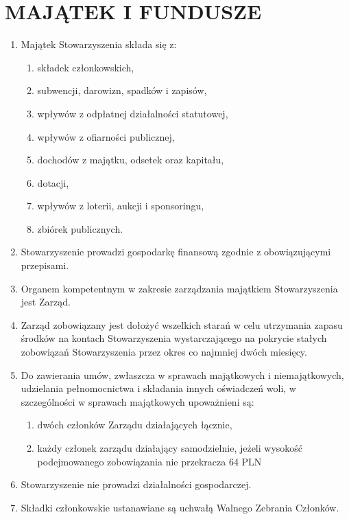 \documentclass{article}
\begin{document}
\section{MAJĄTEK I FUNDUSZE}
  \begin{enumerate}
    \item Majątek Stowarzyszenia składa się z:
      \begin{enumerate}
        \item składek członkowskich,
        \item subwencji, darowizn, spadków i zapisów,
        \item wpływów z odpłatnej działalności statutowej,
        \item wpływów z ofiarności publicznej,
        \item dochodów z majątku, odsetek oraz kapitału,
        \item dotacji,
        \item wpływów z loterii, aukcji i sponsoringu,
        \item zbiórek publicznych.
      \end{enumerate}
    \item Stowarzyszenie prowadzi gospodarkę finansową zgodnie z obowiązującymi przepisami.
    \item Organem kompetentnym w zakresie zarządzania majątkiem Stowarzyszenia jest Zarząd.
    \item Zarząd zobowiązany jest dołożyć wszelkich starań w celu utrzymania zapasu środków na kontach Stowarzyszenia wystarczającego na pokrycie stałych zobowiązań Stowarzyszenia przez okres co najmniej dwóch miesięcy.
    \item Do zawierania umów, zwłaszcza w sprawach majątkowych i niemajątkowych, udzielania pełnomocnictwa i składania innych oświadczeń woli, w szczególności w sprawach majątkowych upoważnieni są:
      \begin{enumerate}
        \item dwóch członków Zarządu działających łącznie,
        \item każdy członek zarządu działający samodzielnie, jeżeli wysokość podejmowanego zobowiązania nie przekracza 64 PLN\@
      \end{enumerate}
    \item Stowarzyszenie nie prowadzi działalności gospodarczej.
    \item Składki członkowskie ustanawiane są uchwałą Walnego Zebrania Członków.
  \end{enumerate}
\end{document}
